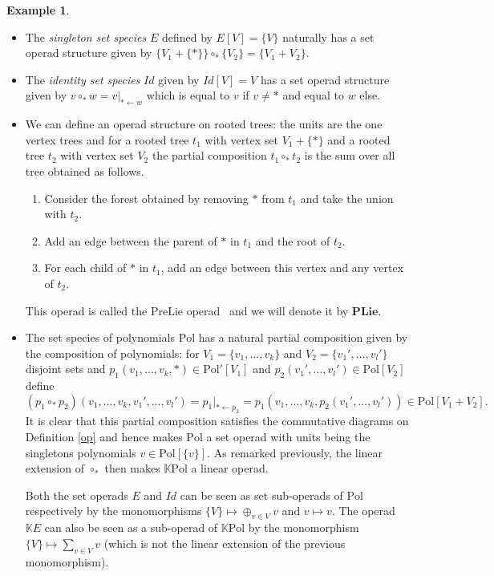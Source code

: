 \documentclass[a4paper]{article}
\theoremstyle{definition}
\newtheorem{example}[definition]{Example}
\newcommand{\K}{\mathbb{K}}
\newcommand{\PLie}{\mathbf{PLie}}
\begin{document}
\begin{example}
\label{exop}
\begin{itemize}
	\item The {\em singleton set species} $E$ defined by $E[V] = \{V\}$ naturally has
	a set operad structure given by $\{V_1+\{\ast\}\}\circ_{\ast}\{V_2\} = \{V_1+V_2\}$.
	\item The {\em identity set species} $Id$ given by $Id[V] = V$ has a set operad
	structure given by $v\circ_{\ast} w = v|_{\ast \leftarrow w}$ which is equal
	to $v$ if $v\not = \ast$ and  equal to $w$ else.
	\item We can define an operad structure on rooted trees: the units are the one
	vertex trees and for a rooted tree $t_1$ with vertex set $V_1+\{\ast\}$ and a 
	rooted tree $t_2$ with vertex set $V_2$ the partial composition $t_1\circ_{\ast} t_2$
	is the sum over all tree obtained as follows.
	\begin{enumerate}
		\item Consider the forest obtained by removing $\ast$ from $t_1$ and take
		the union with $t_2$.

		\item Add an edge between the parent of $\ast$ in $t_1$ and the root of $t_2$.

		\item For each child of $\ast$ in $t_1$, add an edge between this vertex
		and any vertex of $t_2$.
	\end{enumerate}
	This operad is called the PreLie operad~\cite{CL01} and we will denote it by $\PLie$.
	\item The set species of polynomials $\text{Pol}$ has a natural partial 
	composition given by the composition of polynomials: for $V_1=\{v_1,\dots,v_k\}$ 
	and $V_2=\{v_1',\dots,v_l'\}$ disjoint sets and $p_1(v_1,\dots,v_k,\ast)\in \text{Pol}'[V_1]$ 
	and $p_2(v_1',\dots,v_l')\in \text{Pol}[V_2]$ define
	\begin{equation}
		(p_1\circ_{\ast} p_2)(v_1,\dots,v_k,v_1',\dots,v_l') = p_1|_{\ast \leftarrow p_2}
		= p_1(v_1,\dots, v_{k},p_2(v_1',\dots,v_l'))\in \text{Pol}[V_1+V_2].
	\end{equation}
	It is clear that this partial composition satisfies the commutative diagrams on 
	Definition \ref{op} and hence makes $\text{Pol}$ a set operad with units being 
	the singletons polynomials $v\in\text{Pol}[\{v\}]$. As remarked previously, 
	the linear extension of $\circ_{\ast}$ then makes $\K\text{Pol}$ a linear operad.

	Both the set operads $E$ and $Id$ can be seen as set sub-operads of $\text{Pol}$ 
	respectively by the monomorphisms $\{V\}\mapsto \oplus_{v\in V}v$ and $v\mapsto v$. 
	The operad $\K E$ can also be seen as a sub-operad of $\K\text{Pol}$ by the monomorphism 
	$\{V\}\mapsto \sum_{v\in V}v$ (which is not the linear extension of the previous monomorphism).
\end{itemize}
\end{example}
\end{document}

